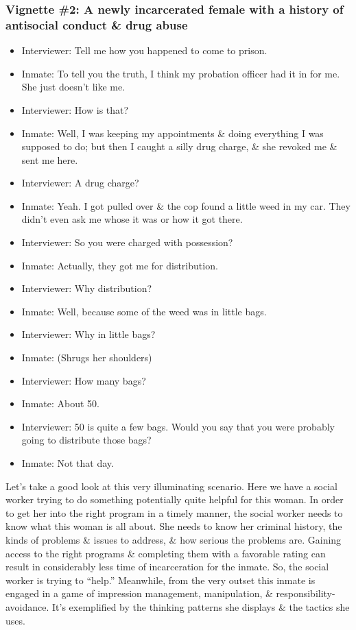 \documentclass{article}
\numberwithin{equation}{section}
\begin{document}
\subsubsection{Vignette \#2: A newly incarcerated female with a history of antisocial conduct \& drug abuse}
\begin{itemize}
	\item Interviewer: Tell me how you happened to come to prison.
	\item Inmate: To tell you the truth, I think my probation officer had it in for me. She just doesn't like me.
	\item Interviewer: How is that?
	\item Inmate: Well, I was keeping my appointments \& doing everything I was supposed to do; but then I caught a silly drug charge, \& she revoked me \& sent me here.
	\item Interviewer: A drug charge?
	\item Inmate: Yeah. I got pulled over \& the cop found a little weed in my car. They didn't even ask me whose it was or how it got there.
	\item Interviewer: So you were charged with possession?
	\item Inmate: Actually, they got me for distribution.
	\item Interviewer: Why distribution?
	\item Inmate: Well, because some of the weed was in little bags.
	\item Interviewer: Why in little bags?
	\item Inmate: (Shrugs her shoulders)
	\item Interviewer: How many bags?
	\item Inmate: About 50.
	\item Interviewer: 50 is quite a few bags. Would you say that you were probably going to distribute those bags?
	\item Inmate: Not that day.
\end{itemize}
Let's take a good look at this very illuminating scenario. Here we have a social worker trying to do something potentially quite helpful for this woman. In order to get her into the right program in a timely manner, the social worker needs to know what this woman is all about. She needs to know her criminal history, the kinds of problems \& issues to address, \& how serious the problems are. Gaining access to the right programs \& completing them with a favorable rating can result in considerably less time of incarceration for the inmate. So, the social worker is trying to ``help.'' Meanwhile, from the very outset this inmate is engaged in a game of impression management, manipulation, \& responsibility-avoidance. It's exemplified by the thinking patterns she displays \& the tactics she uses.
\end{document}
